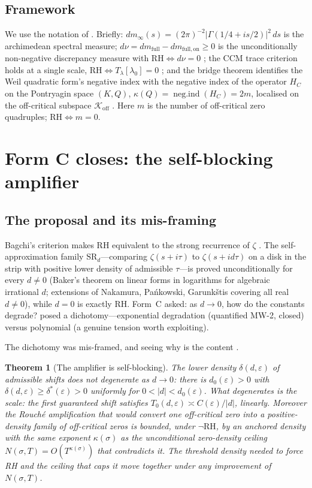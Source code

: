 \documentclass[11pt]{amsart}
\newtheorem{theorem}{Theorem}[section]
\theoremstyle{definition}
\theoremstyle{remark}
\newcommand{\RH}{\mathrm{RH}}
\newcommand{\Koff}{\mathcal{K}_{\mathrm{off}}}
\newcommand{\negind}{\operatorname{neg.ind}}
\newcommand{\dm}{dm_\infty}
\newcommand{\dnu}{d\nu}
\newcommand{\Tl}{T_\lambda}
\begin{document}
\subsection{Framework}\label{ssec:framework}
We use the notation of \cite{P39,P40,P41}. Briefly:
$\dm(s)=(2\pi)^{-2}|\Gamma(1/4+is/2)|^2\,ds$ is the archimedean spectral
measure; $\dnu=dm_{\mathrm{full}}-dm_{\mathrm{full,on}}\ge0$ is the
unconditionally non-negative discrepancy measure with
$\RH\iff\dnu=0$ \cite[~89]{P40}; the CCM trace criterion holds at a
single scale, $\RH\iff\Tl[\lambda_0]=0$ \cite[]{P40}; and the bridge
theorem \cite{P35} identifies the Weil quadratic form's negative index with
the negative index of the operator $H_C$ on the Pontryagin space $(K,Q)$,
$\kappa(Q)=\negind(H_C)=2m$, localised on the off-critical subspace $\Koff$
\cite[Thm~8.1]{P40}. Here $m$ is the number of off-critical zero
quadruples; $\RH\iff m=0$.

\section{Form C closes: the self-blocking amplifier}\label{sec:formC}

\subsection{The proposal and its mis-framing}
Bagchi's criterion makes RH equivalent to the strong recurrence of
$\zeta$ \cite[]{P40}. The self-approximation family
$\mathrm{SR}_d$---comparing $\zeta(s+i\tau)$ to $\zeta(s+id\tau)$ on a disk
in the strip with positive lower density of admissible $\tau$---is proved
unconditionally for every $d\ne0$ (Baker's theorem on linear forms in
logarithms for algebraic irrational $d$; extensions of Nakamura,
Pa\'nkowski, Garunk\v{s}tis covering all real $d\ne0$), while $d=0$ is
exactly RH. Form~C asked: as $d\to0$, how do the constants degrade?
\cite{P41} posed a dichotomy---exponential degradation (quantified MW-2,
closed) versus polynomial (a genuine tension worth exploiting).

The dichotomy was mis-framed, and seeing why is the content
\cite[]{P40}.

\begin{theorem}[The amplifier is self-blocking]\label{thm:formC-selfblock}
The lower density $\delta(d,\varepsilon)$ of admissible shifts does not
degenerate as $d\to0$: there is $d_0(\varepsilon)>0$ with
$\delta(d,\varepsilon)\ge\delta^*(\varepsilon)>0$ uniformly for
$0<|d|<d_0(\varepsilon)$. What degenerates is the scale: the first
guaranteed shift satisfies $T_0(d,\varepsilon)\asymp C(\varepsilon)/|d|$,
linearly. Moreover the Rouch\'e amplification that would convert one
off-critical zero into a positive-density family of off-critical zeros is
bounded, under $\neg\RH$, by an anchored density with the same exponent
$\kappa(\sigma)$ as the unconditional zero-density ceiling
$N(\sigma,T)=O(T^{\kappa(\sigma)})$ that contradicts it. The threshold
density needed to force RH and the ceiling that caps it move together under
any improvement of $N(\sigma,T)$.
\end{theorem}
\end{document}
